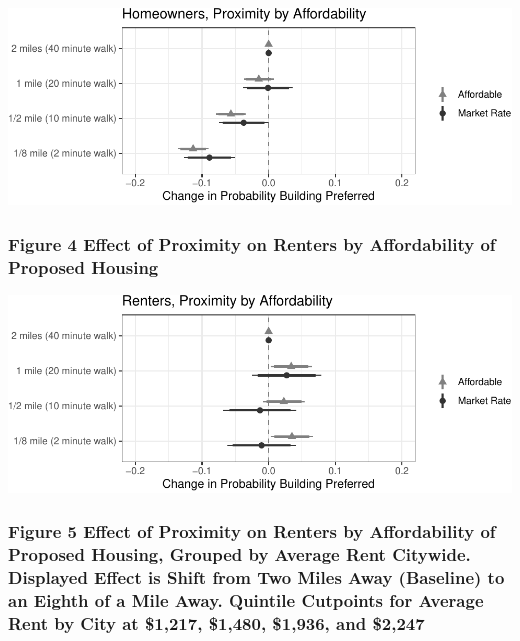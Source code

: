 \documentclass[]{article}
\begin{document}
\includegraphics{Zheng-Ruth-Renters-Paper_files/figure-latex/Figure 3 print-1.pdf}

\hypertarget{figure-4-effect-of-proximity-on-renters-by-affordability-of-proposed-housing}{%
\subsubsection{Figure 4 Effect of Proximity on Renters by Affordability of Proposed Housing}\label{figure-4-effect-of-proximity-on-renters-by-affordability-of-proposed-housing}}

\includegraphics{Zheng-Ruth-Renters-Paper_files/figure-latex/Figure 4-1.pdf}

\hypertarget{figure-5-effect-of-proximity-on-renters-by-affordability-of-proposed-housing-grouped-by-average-rent-citywide.-displayed-effect-is-shift-from-two-miles-away-baseline-to-an-eighth-of-a-mile-away.-quintile-cutpoints-for-average-rent-by-city-at-1217-1480-1936-and-2247}{%
\subsubsection{Figure 5 Effect of Proximity on Renters by Affordability of Proposed Housing, Grouped by Average Rent Citywide. Displayed Effect is Shift from Two Miles Away (Baseline) to an Eighth of a Mile Away. Quintile Cutpoints for Average Rent by City at \$1,217, \$1,480, \$1,936, and \$2,247}\label{figure-5-effect-of-proximity-on-renters-by-affordability-of-proposed-housing-grouped-by-average-rent-citywide.-displayed-effect-is-shift-from-two-miles-away-baseline-to-an-eighth-of-a-mile-away.-quintile-cutpoints-for-average-rent-by-city-at-1217-1480-1936-and-2247}}
\end{document}

